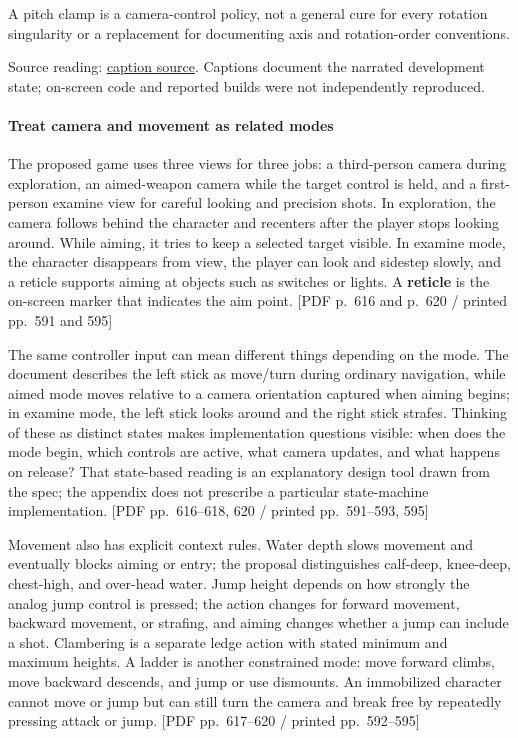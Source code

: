 A pitch clamp is a camera-control policy, not a general cure for every rotation singularity or a replacement for documenting axis and rotation-order conventions.

Source reading: \href{https://www.youtube.com/watch?v=s9xSwQvbG2w}{caption source}. Captions document the narrated development state; on-screen code and reported builds were not independently reproduced.

\paragraph{Treat camera and movement as related modes}\label{06-engine-ii-ch026-treat-camera-and-movement-as-related-modes}

The proposed game uses three views for three jobs: a third-person camera during exploration, an aimed-weapon camera while the target control is held, and a first-person examine view for careful looking and precision shots. In exploration, the camera follows behind the character and recenters after the player stops looking around. While aiming, it tries to keep a selected target visible. In examine mode, the character disappears from view, the player can look and sidestep slowly, and a reticle supports aiming at objects such as switches or lights. A \textbf{reticle} is the on-screen marker that indicates the aim point. {[}PDF p.~616 and p.~620 / printed pp.~591 and 595{]}

The same controller input can mean different things depending on the mode. The document describes the left stick as move/turn during ordinary navigation, while aimed mode moves relative to a camera orientation captured when aiming begins; in examine mode, the left stick looks around and the right stick strafes. Thinking of these as distinct states makes implementation questions visible: when does the mode begin, which controls are active, what camera updates, and what happens on release? That state-based reading is an explanatory design tool drawn from the spec; the appendix does not prescribe a particular state-machine implementation. {[}PDF pp.~616--618, 620 / printed pp.~591--593, 595{]}

Movement also has explicit context rules. Water depth slows movement and eventually blocks aiming or entry; the proposal distinguishes calf-deep, knee-deep, chest-high, and over-head water. Jump height depends on how strongly the analog jump control is pressed; the action changes for forward movement, backward movement, or strafing, and aiming changes whether a jump can include a shot. Clambering is a separate ledge action with stated minimum and maximum heights. A ladder is another constrained mode: move forward climbs, move backward descends, and jump or use dismounts. An immobilized character cannot move or jump but can still turn the camera and break free by repeatedly pressing attack or jump. {[}PDF pp.~617--620 / printed pp.~592--595{]}

